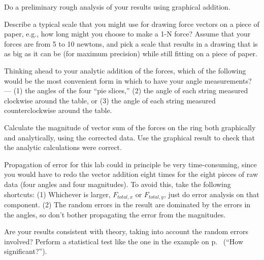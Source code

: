 \selfcheck

Do a preliminary rough analysis of your results using graphical addition.

\prelab

\prelabquestion  Describe a typical scale that you might use for drawing
force vectors on a piece of paper, e.g., how long might you
choose to make a 1-N force?  Assume that your forces are
from 5 to 10 newtons, and pick a scale that results in a drawing that
is as big as it can be (for maximum precision) while still fitting on
a piece of paper.

\prelabquestion Thinking ahead to your analytic addition of the forces,
which of the following would be the most convenient form in which to have
your angle measurements? --- (1) the angles of the four ``pie slices,''
(2) the angle of each string measured clockwise around the table,
or (3) the angle of each string measured counterclockwise around the table.

\analysis

Calculate the magnitude of vector sum of the forces on the
ring both graphically and analytically, using the corrected data. Use the
graphical result to check that the analytic calculations were correct.

Propagation of error for this lab could in principle be very time-consuming,
since you would have to redo the vector addition eight times for the eight
pieces of raw data (four angles and four magnitudes). 
To avoid this, take the following shortcuts: (1) Whichever is larger,
$F_{total,x}$ or $F_{total,y}$, just do error analysis on that component.
(2) The random errors in the result are dominated by the errors in the angles,
so don't bother propagating the error from the magnitudes.

Are your results consistent with theory, taking into account
the random errors involved? Perform a statistical test like the
one in the example on p.~\pageref{eg:fine-structure} (``How significant?'').
